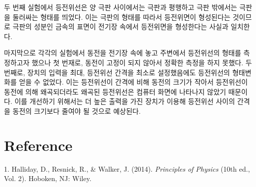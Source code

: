 \documentclass[a4paper]{article}
\begin{document}
	두 번째 실험에서 등전위선은 양 극판 사이에서는 극판과 평행하고 극판 밖에서는 극판을 둘러싸는 형태를 띄었다. 
	이는 극판의 형태를 따라서 등전위면이 형성된다는 것이므로 극판의 성분인 금속의 표면이 전기장 속에서 등전위면을 형성한다는 사실과 일치한다.

	마지막으로 각각의 실험에서 동전을 전기장 속에 놓고 주변에서 등전위선의 형태를 측정하고자 했으나 첫 번재로, 동전이 고정이 되지 않아서 정확한 측정을 하지 못했다. 
	두 번째로, 장치의 입력을 최대, 등전위선 간격을 최소로 설정했음에도 등전위선의 형태변화를 얻을 수 없었다. 이는 등전위선이 간격에 비해 동전의 크기가 작아서 등전위선이 동전에 의해 왜곡되더라도 왜곡된 등전위선은 컴퓨터 화면에 나타나지 않았기 때문이다. 
	이를 개선하기 위해서는 더 높은 출력을 가진 장치가 이용해 등전위선 사이의 간격을 동전의 크기보다 줄여야 될 것으로 예상된다.

\section{Reference}
	1. Halliday, D., Resnick, R., \& Walker, J. (2014). {\it{}Principles of Physics} (10th ed., Vol. 2). Hoboken, NJ: Wiley. 
\end{document}
